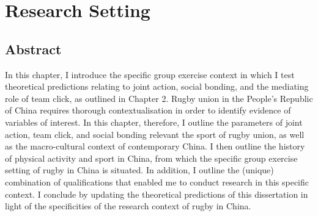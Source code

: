 
\chapter{\label{researchSetting}Research Setting}


\minitoc




\section{Abstract}

In this chapter, I introduce the specific group exercise context in which I test theoretical predictions relating to joint action, social bonding, and the mediating role of team click, as outlined in Chapter 2.  Rugby union in the People's Republic of China requires thorough contextualisation in order to identify evidence of variables of interest.  In this chapter, therefore, I outline the parameters of joint action, team click, and social bonding relevant the sport of rugby union, as well as the macro-cultural context of contemporary China.  I then outline the history of physical activity and sport in China, from which the specific group exercise setting of rugby in China is situated.   In addition, I outline the (unique) combination of qualifications that enabled me to conduct research in this specific context.  I conclude by updating the theoretical predictions of this dissertation in light of the specificities of the research context of rugby in China.


